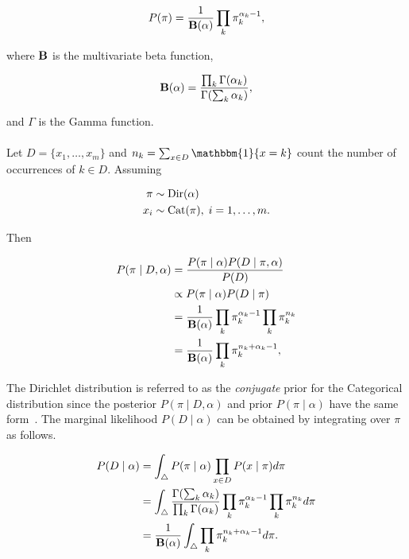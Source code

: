 \documentclass[12pt]{report}
\newcommand{\1}[0]{\mathbbm{1}}
\newcommand{\Cat}[0]{\textnormal{Cat}}
\newcommand{\Dir}[0]{\textnormal{Dir}}
\newcommand{\Bf}[0]{\text{\textbf{B}}}
\begin{document}
\begin{equation}
    P(\pi) = \frac{1}{\Bf(\alpha)} \prod_k \pi_k^{\alpha_k-1}, \label{eq:dir-pdf}
\end{equation}

where $\Bf$ is the multivariate beta function,

\begin{equation}
    \Bf(\alpha) = \frac{\prod_k \Gamma(\alpha_k)}{\Gamma(\sum_k \alpha_k)}, \label{eq:betafunc}
\end{equation}

and $\Gamma$ is the Gamma function.
\\\\
Let $D = \{x_1, \ldots, x_m\}$ and $n_k = \sum_{x \in D} \1\{x = k\}$ count
the number of occurrences of $k \in D$. Assuming

\begin{align*}
    \pi & \sim \Dir(\alpha) \\
    x_i & \sim \Cat(\pi),\; i = 1, \ldots, m.
\end{align*}

Then

\begin{align*}
    P(\pi \mid D, \alpha)
    &= \frac{P(\pi \mid \alpha) P(D \mid \pi, \alpha)}{P(D)} \\
    & \propto P(\pi \mid \alpha) P(D \mid \pi) \\
    &= \frac{1}{\Bf(\alpha)} \prod_k \pi_k^{\alpha_k - 1} \prod_k \pi_k^{n_k} \\
    &= \frac{1}{\Bf(\alpha)} \prod_k \pi_k^{n_k + \alpha_k - 1},
\end{align*}

The Dirichlet distribution is referred to as the \emph{conjugate} prior for the
Categorical distribution since the posterior $P(\pi \mid D, \alpha)$ and prior $P(\pi \mid \alpha)$
have the same form~\cite{gelman-bayesian-data-analysis}. The marginal likelihood $P(D \mid \alpha)$
can be obtained by integrating over $\pi$ as follows.

\begin{align}
    P(D \mid \alpha)
    &= \int_{\triangle} P(\pi \mid \alpha)\prod_{x \in D} P(x \mid \pi) d \pi \nonumber \\
    &= \int_{\triangle} \frac{\Gamma(\sum_k \alpha_k)}{\prod_k \Gamma(\alpha_k)}
                        \prod_k \pi^{\alpha_k - 1}_k \prod_k \pi_k^{n_k} d \pi \nonumber \\
    &= \frac{1}{\Bf(\alpha)}
       \int_{\triangle} \prod_k \pi_k^{n_k + \alpha_k - 1} d \pi. \label{eq:unnormed-dir}
\end{align}
\end{document}
